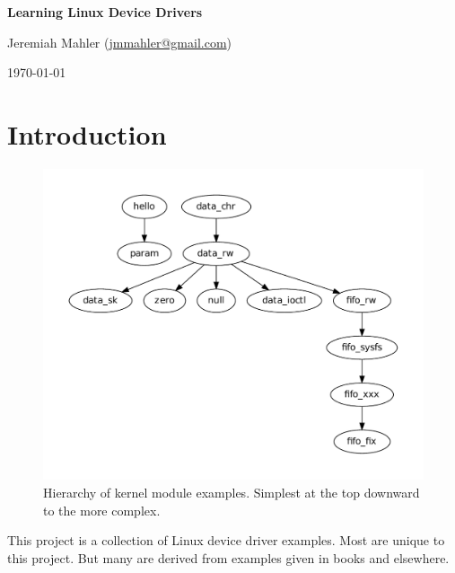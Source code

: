 \documentclass{article}
\begin{document}
\VerbatimFootnotes


\thispagestyle{empty}

\centerline{\Large \textbf{Learning Linux Device Drivers}}
\vspace{0.1in}
\centerline{\normalsize {Jeremiah Mahler} ({\href{mailto:jmmahler@gmail.com}{jmmahler@gmail.com}})}
\centerline{\small \today}
\vspace{0.2in}


\tableofcontents
\pagebreak

\section{Introduction}

\begin{figure}[h!]
\begin{center}
\includegraphics[scale=0.6]{hierarchy/hier}
\end{center}
\caption{Hierarchy of kernel module examples.  Simplest at the
top downward to the more complex.}\label{fig:hier}
\end{figure}

\nocite{corbet2009linux}
\nocite{venkateswaran2008essential}
\nocite{love2010linux}
\nocite{love2013linux}

This project is a collection of Linux device driver examples.
Most are unique to this project.  But many are derived from
examples given in books and elsewhere.
\end{document}
